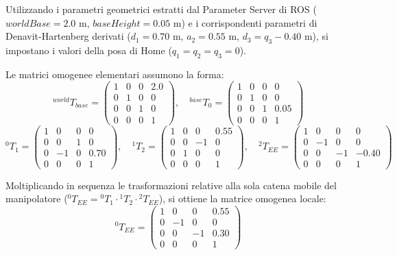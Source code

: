 \documentclass[11pt, a4paper]{report}
\begin{document}
Utilizzando i parametri geometrici estratti dal Parameter Server di ROS (\(worldBase = 2.0\) m, \(baseHeight = 0.05\) m) e i corrispondenti parametri di Denavit-Hartenberg derivati (\(d_1 = 0.70\) m, \(a_2 = 0.55\) m, \(d_3 = q_3 - 0.40\) m), si impostano i valori della posa di Home (\(q_1 = q_2 = q_3 = 0\)).

Le matrici omogenee elementari assumono la forma:
\[
    ^{world}T_{base} = \begin{pmatrix} 1 & 0 & 0 & 2.0 \\ 0 & 1 & 0 & 0 \\ 0 & 0 & 1 & 0 \\ 0 & 0 & 0 & 1 \end{pmatrix}, \quad
    ^{base}T_{0} = \begin{pmatrix} 1 & 0 & 0 & 0 \\ 0 & 1 & 0 & 0 \\ 0 & 0 & 1 & 0.05 \\ 0 & 0 & 0 & 1 \end{pmatrix}
\]
\[
    ^{0}T_{1} = \begin{pmatrix} 1 & 0 & 0 & 0 \\ 0 & 0 & 1 & 0 \\ 0 & -1 & 0 & 0.70 \\ 0 & 0 & 0 & 1 \end{pmatrix}, \quad
    ^{1}T_{2} = \begin{pmatrix} 1 & 0 & 0 & 0.55 \\ 0 & 0 & -1 & 0 \\ 0 & 1 & 0 & 0 \\ 0 & 0 & 0 & 1 \end{pmatrix}, \quad
    ^{2}T_{EE} = \begin{pmatrix} 1 & 0 & 0 & 0 \\ 0 & -1 & 0 & 0 \\ 0 & 0 & -1 & -0.40 \\ 0 & 0 & 0 & 1 \end{pmatrix}
\]

Moltiplicando in sequenza le trasformazioni relative alla sola catena mobile del manipolatore (\(^{0}T_{EE} = {^{0}T_1} \cdot {^{1}T_2} \cdot {^{2}T_{EE}}\)), si ottiene la matrice omogenea locale:
\[
    ^{0}T_{EE} = \begin{pmatrix} 1 & 0 & 0 & 0.55 \\ 0 & -1 & 0 & 0 \\ 0 & 0 & -1 & 0.30 \\ 0 & 0 & 0 & 1 \end{pmatrix}
\]
\end{document}
